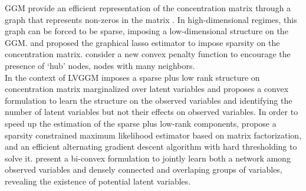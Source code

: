 \documentclass[letterpaper]{article}
\begin{document}
GGM provide an efficient representation of the concentration matrix through a graph that represents non-zeros in the matrix \citep{lauritzen1996graphical}. In high-dimensional regimes, this graph can be forced to be sparse, imposing a low-dimensional structure on the GGM. \citet{yuan2007model} and \citet{banerjee2008model} proposed the graphical lasso estimator to impose sparsity on the concentration matrix. \citet{tan2014learning} consider a new convex penalty function to encourage the presence of ‘hub’ nodes, nodes with many neighbors.\\

In the context of LVGGM \citet{chandrasekaran2010} imposes a sparse plus low rank structure on concentration matrix marginalized over latent variables and proposes a convex formulation to learn the structure on the observed variables and identifying the number of latent variables but not their effects on observed variables. In order to speed
up the estimation of the sparse plus low-rank components,\citet{xu2017speeding} propose a sparsity constrained maximum likelihood estimator based on matrix factorization, and an efficient alternating gradient descent algorithm with hard thresholding to solve it. \citet{hosseini2016learning}  present a bi-convex formulation to jointly learn both a network among observed variables and densely connected and overlaping groups of variables, revealing the existence of potential latent variables. 
%
\end{document}

